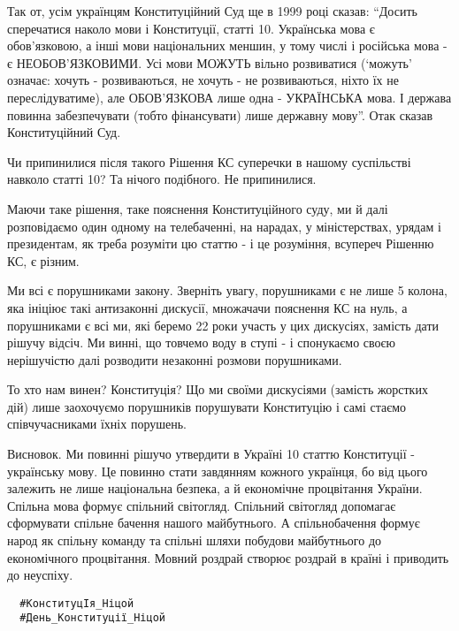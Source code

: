 Так от, усім українцям Конституційний Суд ще в 1999 році сказав: \enquote{Досить
сперечатися наколо мови і Конституції, статті 10. Українська мова є
обов'язковою, а інші мови національних меншин,  у тому числі і російська мова -
є НЕОБОВ'ЯЗКОВИМИ. Усі мови МОЖУТЬ вільно розвиватися (\enquote{можуть} означає: хочуть
- розвиваються, не хочуть - не розвиваються, ніхто їх не переслідуватиме), але
ОБОВ'ЯЗКОВА лише одна - УКРАЇНСЬКА мова. І держава повинна забезпечувати (тобто
фінансувати) лише державну мову}. Отак сказав Конституційний Суд. 

Чи припинилися після такого Рішення КС суперечки в нашому суспільстві навколо статті 10? Та нічого подібного. Не припинилися.

Маючи таке рішення, таке пояснення Конституційного суду, ми й далі розповідаємо
один одному на телебаченні, на нарадах, у міністерствах, урядам і президентам,
як треба розуміти цю статтю - і це розуміння, всупереч Рішенню КС, є різним. 

Ми всі є порушниками закону.  Зверніть увагу, порушниками є не лише 5 колона,
яка ініціює такі антизаконні дискусії, множачачи пояснення КС на нуль, а
порушниками є всі ми, які беремо 22 роки участь у цих дискусіях, замість дати
рішучу відсіч. Ми винні, що товчемо воду в ступі  - і спонукаємо своєю
нерішучістю далі розводити незаконні розмови порушниками. 

То хто нам винен? Конституція? Що ми своїми дискусіями (замість жорстких дій)
лише заохочуємо порушників порушувати Конституцію і самі стаємо співчучасниками
їхніх порушень.

Висновок. Ми повинні рішучо утвердити в Україні 10 статтю Конституції  -
українську мову. Це повинно стати завдянням кожного українця, бо від цього
залежить не лише національна безпека, а й економічне процвітання України.
Спільна мова формує спільний світогляд. Спільний світогляд допомагає сформувати
спільне бачення нашого майбутнього. А спільнобачення формує народ як спільну
команду та спільні шляхи побудови майбутнього до економічного процвітання.
Мовний роздрай створює роздрай в країні і приводить до неуспіху. 

\begin{verbatim}
  #КонституцІя_Ніцой
  #День_Конституції_Ніцой
\end{verbatim}
